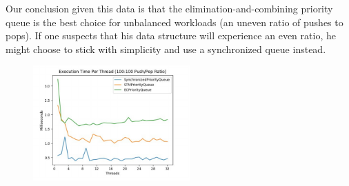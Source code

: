 \documentclass[10pt]{asme2ej}
\begin{document}
Our conclusion given this data is that the elimination-and-combining priority queue is the best choice for unbalanced workloads (an uneven ratio of pushes to pops). If one suspects that his data structure will experience an even ratio, he might choose to stick with simplicity and use a synchronized queue instead.

\begin{figure}[htp]
\centering
\includegraphics[width=6cm]{9.jpg}
\end{figure}




\end{document}
